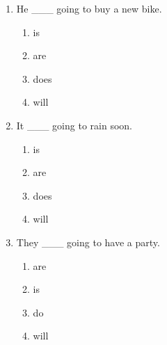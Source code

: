 \documentclass[11pt,a4paper]{ctexart}
\begin{document}
\begin{enumerate}[leftmargin=*,itemsep=4pt]
\begin{enumerate}[label=\Alph*.,leftmargin=2em,itemsep=1pt,topsep=2pt]
\end{enumerate}
\item He \_\_\_ going to buy a new bike.
\begin{enumerate}[label=\Alph*.,leftmargin=2em,itemsep=1pt,topsep=2pt]
\item is
\item are
\item does
\item will
\end{enumerate}
\item It \_\_\_ going to rain soon.
\begin{enumerate}[label=\Alph*.,leftmargin=2em,itemsep=1pt,topsep=2pt]
\item is
\item are
\item does
\item will
\end{enumerate}
\item They \_\_\_ going to have a party.
\begin{enumerate}[label=\Alph*.,leftmargin=2em,itemsep=1pt,topsep=2pt]
\item are
\item is
\item do
\item will
\end{enumerate}
\end{enumerate}
\end{document}
